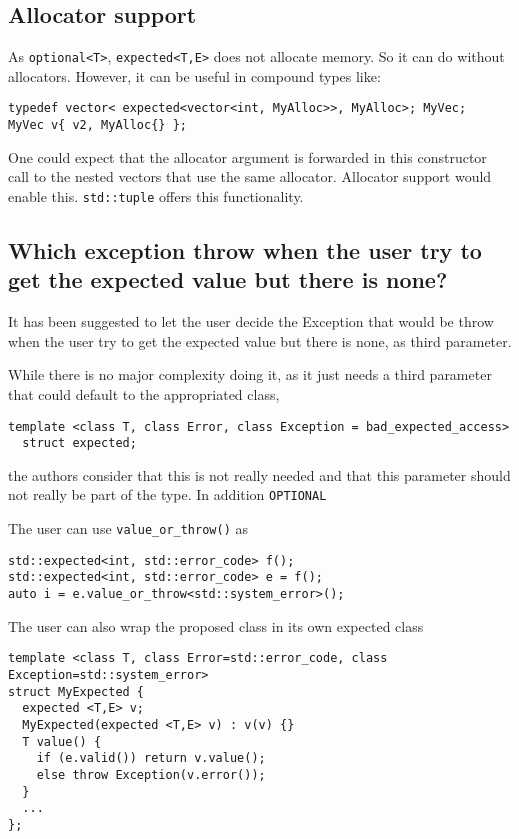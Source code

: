 \documentclass[a4paper,10pt]{article}
\newcommand{\cpp}[1]{\lstinline{#1}}
\begin{document}
\subsection{Allocator support}

As \cpp{optional<T>},  \cpp{expected<T,E>} does not allocate memory. So it can do without allocators. However, it can be useful in compound types like:

\begin{lstlisting}
typedef vector< expected<vector<int, MyAlloc>>, MyAlloc>; MyVec;
MyVec v{ v2, MyAlloc{} };
\end{lstlisting}

One could expect that the allocator argument is forwarded in this constructor call to the nested vectors that use the same allocator. Allocator support would enable this. \cpp{std::tuple} offers this functionality.

\subsection{Which exception throw when the user try to get the expected value but there is none?}

It has been suggested to let the user decide the Exception that would be throw when the user try to get the expected value but there is none, as third parameter. 

While there is no major complexity doing it, as it just needs a third parameter that could default to the appropriated class, 

\begin{lstlisting}
template <class T, class Error, class Exception = bad_expected_access>
  struct expected;
\end{lstlisting}

the authors consider that this is not really needed and that this parameter should not really be part of the type. In addition \cpp{OPTIONAL}

The user can use \cpp{value_or_throw()} as

\begin{lstlisting}
std::expected<int, std::error_code> f();
std::expected<int, std::error_code> e = f();
auto i = e.value_or_throw<std::system_error>();  
\end{lstlisting}

The user can also wrap the proposed class in its own expected class

\begin{lstlisting}
template <class T, class Error=std::error_code, class Exception=std::system_error>
struct MyExpected {
  expected <T,E> v;
  MyExpected(expected <T,E> v) : v(v) {}
  T value() {  
    if (e.valid()) return v.value();
    else throw Exception(v.error());
  }
  ...
};
\end{lstlisting}
\end{document}
